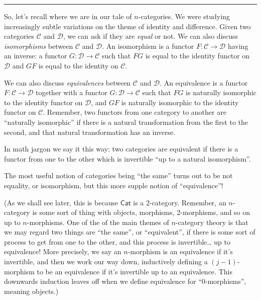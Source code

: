 \documentclass{article}
\begin{document}
\begin{center}\rule{0.5\linewidth}{0.5pt}\end{center}

So, let's recall where we are in our tale of \(n\)-categories. We were
studying increasingly subtle variations on the theme of identity and
difference. Given two categories \(\mathcal{C}\) and \(\mathcal{D}\), we
can ask if they are \emph{equal} or not. We can also discuss
\emph{isomorphisms} between \(\mathcal{C}\) and \(\mathcal{D}\). An
isomorphism is a functor \(F\colon\mathcal{C}\to\mathcal{D}\) having an
inverse: a functor \(G\colon\mathcal{D}\to\mathcal{C}\) such that \(FG\)
is equal to the identity functor on \(\mathcal{D}\) and \(GF\) is equal
to the identity on \(\mathcal{C}\).

We can also discuss \emph{equivalences} between \(\mathcal{C}\) and
\(\mathcal{D}\). An equivalence is a functor
\(F\colon\mathcal{C}\to\mathcal{D}\) together with a functor
\(G\colon\mathcal{D}\to\mathcal{C}\) such that \(FG\) is naturally
isomorphic to the identity functor on \(\mathcal{D}\), and \(GF\) is
naturally isomorphic to the identity functor on \(\mathcal{C}\).
Remember, two functors from one category to another are ``naturally
isomorphic'' if there is a natural transformation from the first to the
second, and that natural transformation has an inverse.

In math jargon we say it this way: two categories are equivalent if
there is a functor from one to the other which is invertible ``up to a
natural isomorphism''.

The most useful notion of categories being ``the same'' turns out to be
not equality, or isomorphism, but this more supple notion of
``equivalence''!

(As we shall see later, this is because \(\mathsf{Cat}\) is a
2-category. Remember, an \(n\)-category is some sort of thing with
objects, morphisms, 2-morphisms, and so on up to \(n\)-morphisms. One of
the of the main themes of \(n\)-category theory is that we may regard
two things are ``the same'', or ``equivalent'', if there is some sort of
process to get from one to the other, and this process is
invertible\ldots{} up to equivalence! More precisely, we say an
\(n\)-morphism is an equivalence if it's invertible, and then we work
our way down, inductively defining a \((j-1)\)-morphism to be an
equivalence if it's invertible up to an equivalence. This downwards
induction leaves off when we define equivalence for ``0-morphisms'',
meaning objects.)
\end{document}
